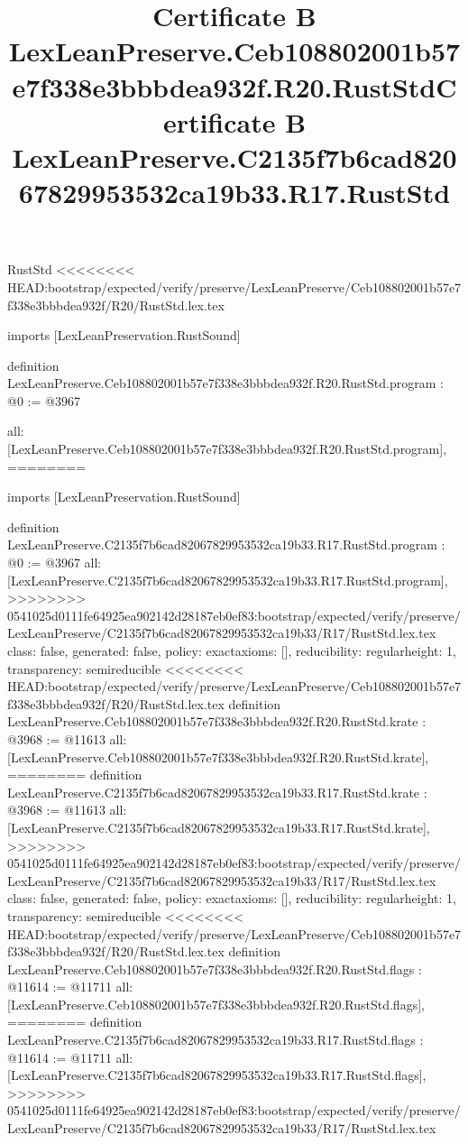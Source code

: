 \begin{lexlean}{RustStd}
<<<<<<<< HEAD:bootstrap/expected/verify/preserve/LexLeanPreserve/Ceb108802001b57e7f338e3bbbdea932f/R20/RustStd.lex.tex
\title{Certificate B LexLeanPreserve.Ceb108802001b57e7f338e3bbbdea932f.R20.RustStd}
\begin{coremodule}
imports [LexLeanPreservation.RustSound]

definition LexLeanPreserve.Ceb108802001b57e7f338e3bbbdea932f.R20.RustStd.program : @0 := @3967 {
  all: [LexLeanPreserve.Ceb108802001b57e7f338e3bbbdea932f.R20.RustStd.program],
========
\title{Certificate B LexLeanPreserve.C2135f7b6cad82067829953532ca19b33.R17.RustStd}
\begin{coremodule}
imports [LexLeanPreservation.RustSound]

definition LexLeanPreserve.C2135f7b6cad82067829953532ca19b33.R17.RustStd.program : @0 := @3967 {
  all: [LexLeanPreserve.C2135f7b6cad82067829953532ca19b33.R17.RustStd.program],
>>>>>>>> 0541025d0111fe64925ea902142d28187eb0ef83:bootstrap/expected/verify/preserve/LexLeanPreserve/C2135f7b6cad82067829953532ca19b33/R17/RustStd.lex.tex
  class: false,
  generated: false,
  policy: exact{axioms: []},
  reducibility: regular{height: 1},
  transparency: semireducible
}
<<<<<<<< HEAD:bootstrap/expected/verify/preserve/LexLeanPreserve/Ceb108802001b57e7f338e3bbbdea932f/R20/RustStd.lex.tex
definition LexLeanPreserve.Ceb108802001b57e7f338e3bbbdea932f.R20.RustStd.krate : @3968 := @11613 {
  all: [LexLeanPreserve.Ceb108802001b57e7f338e3bbbdea932f.R20.RustStd.krate],
========
definition LexLeanPreserve.C2135f7b6cad82067829953532ca19b33.R17.RustStd.krate : @3968 := @11613 {
  all: [LexLeanPreserve.C2135f7b6cad82067829953532ca19b33.R17.RustStd.krate],
>>>>>>>> 0541025d0111fe64925ea902142d28187eb0ef83:bootstrap/expected/verify/preserve/LexLeanPreserve/C2135f7b6cad82067829953532ca19b33/R17/RustStd.lex.tex
  class: false,
  generated: false,
  policy: exact{axioms: []},
  reducibility: regular{height: 1},
  transparency: semireducible
}
<<<<<<<< HEAD:bootstrap/expected/verify/preserve/LexLeanPreserve/Ceb108802001b57e7f338e3bbbdea932f/R20/RustStd.lex.tex
definition LexLeanPreserve.Ceb108802001b57e7f338e3bbbdea932f.R20.RustStd.flags : @11614 := @11711 {
  all: [LexLeanPreserve.Ceb108802001b57e7f338e3bbbdea932f.R20.RustStd.flags],
========
definition LexLeanPreserve.C2135f7b6cad82067829953532ca19b33.R17.RustStd.flags : @11614 := @11711 {
  all: [LexLeanPreserve.C2135f7b6cad82067829953532ca19b33.R17.RustStd.flags],
>>>>>>>> 0541025d0111fe64925ea902142d28187eb0ef83:bootstrap/expected/verify/preserve/LexLeanPreserve/C2135f7b6cad82067829953532ca19b33/R17/RustStd.lex.tex
}}}
\end{coremodule}}
\end{coremodule}
\end{lexlean}
